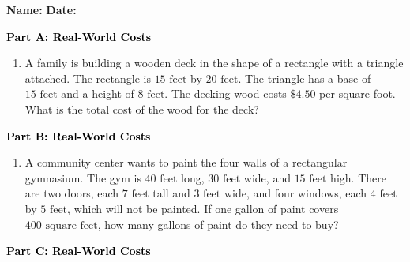 \documentclass[12pt, letterpaper, fleqn]{article}
\begin{document}
\textbf{Name:} \underline{\hspace{5cm}}
\hfill
\textbf{Date:} \underline{\hspace{3cm}}\\

\begin{tcolorbox}[colback=customteal!20]
\large\textcolor{black}{\textbf{Part A: Real-World Costs}}
\end{tcolorbox}

\vspace{3mm}

\begin{enumerate}[itemsep=5.5cm, leftmargin=0.6cm]
\item A family is building a wooden deck in the shape of a rectangle with a triangle attached. The rectangle is $15\text{ feet}$ by $20\text{ feet}$. The triangle has a base of $15\text{ feet}$ and a height of $8\text{ feet}$. The decking wood costs $\$4.50$ per square foot. What is the total cost of the wood for the deck?
\end{enumerate}

\newpage

\begin{tcolorbox}[colback=customteal!20]
\large\textcolor{black}{\textbf{Part B: Real-World Costs}}
\end{tcolorbox}

\vspace{3mm}

\begin{enumerate}[itemsep=5.5cm, leftmargin=0.6cm, resume]
\item A community center wants to paint the four walls of a rectangular gymnasium. The gym is $40\text{ feet}$ long, $30\text{ feet}$ wide, and $15\text{ feet}$ high. There are two doors, each $7\text{ feet}$ tall and $3\text{ feet}$ wide, and four windows, each $4\text{ feet}$ by $5\text{ feet}$, which will not be painted. If one gallon of paint covers $400\text{ square feet}$, how many gallons of paint do they need to buy?
\end{enumerate}

\newpage

\begin{tcolorbox}[colback=customteal!20]
\large\textcolor{black}{\textbf{Part C: Real-World Costs}}
\end{tcolorbox}
\end{document}
